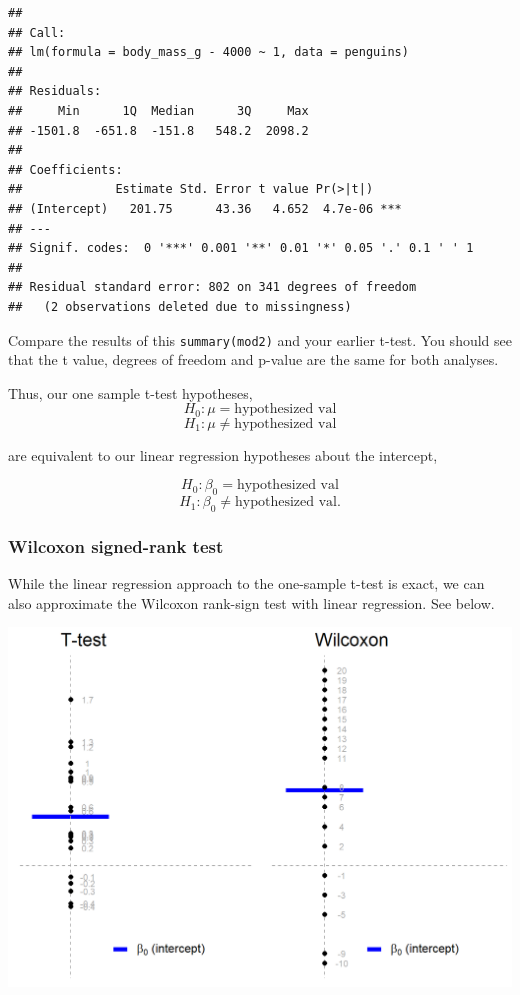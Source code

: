 \documentclass[
  openany]{book}
\begin{document}
\begin{verbatim}
## 
## Call:
## lm(formula = body_mass_g - 4000 ~ 1, data = penguins)
## 
## Residuals:
##     Min      1Q  Median      3Q     Max 
## -1501.8  -651.8  -151.8   548.2  2098.2 
## 
## Coefficients:
##             Estimate Std. Error t value Pr(>|t|)    
## (Intercept)   201.75      43.36   4.652  4.7e-06 ***
## ---
## Signif. codes:  0 '***' 0.001 '**' 0.01 '*' 0.05 '.' 0.1 ' ' 1
## 
## Residual standard error: 802 on 341 degrees of freedom
##   (2 observations deleted due to missingness)
\end{verbatim}

Compare the results of this \texttt{summary(mod2)} and your earlier t-test. You should see that the t value, degrees of freedom and p-value are the same for both analyses.

Thus, our one sample t-test hypotheses,
\[H_0: \mu = \text{hypothesized val}\]
\[H_1: \mu \ne \text{hypothesized val}\]

are equivalent to our linear regression hypotheses about the intercept,

\[H_0: \beta_0 = \text{hypothesized val}\]
\[H_1: \beta_0 \ne \text{hypothesized val}.\]

\hypertarget{wilcoxon-signed-rank-test}{%
\subsubsection{Wilcoxon signed-rank test}\label{wilcoxon-signed-rank-test}}

While the linear regression approach to the one-sample t-test is exact, we can also approximate the Wilcoxon rank-sign test with linear regression. See below.

\begin{center}\includegraphics[width=0.9\linewidth]{images/m1/wilcoxon} \end{center}
\end{document}
